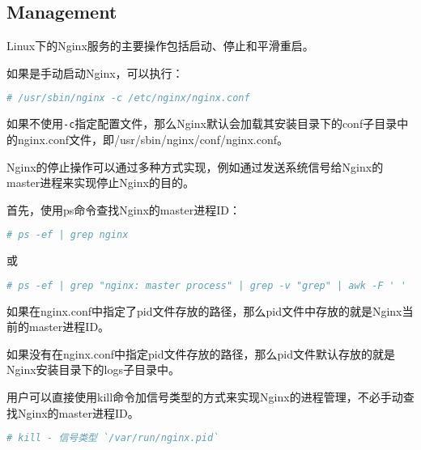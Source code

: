 \subsection{Management}



Linux下的Nginx服务的主要操作包括启动、停止和平滑重启。

如果是手动启动Nginx，可以执行：

\begin{lstlisting}[language=bash]
# /usr/sbin/nginx -c /etc/nginx/nginx.conf
\end{lstlisting}

如果不使用\texttt{-c}指定配置文件，那么Nginx默认会加载其安装目录下的conf子目录中的nginx.conf文件，即/usr/sbin/nginx/conf/nginx.conf。

Nginx的停止操作可以通过多种方式实现，例如通过发送系统信号给Nginx的master进程来实现停止Nginx的目的。

首先，使用ps命令查找Nginx的master进程ID：

\begin{lstlisting}[language=bash]
# ps -ef | grep nginx 
\end{lstlisting}

或


\begin{lstlisting}[language=bash]
# ps -ef | grep "nginx: master process" | grep -v "grep" | awk -F ' ' '{print $2}'
\end{lstlisting}



\begin{compactitem}
\item 如果在nginx.conf中指定了pid文件存放的路径，那么pid文件中存放的就是Nginx当前的master进程ID。

\item 如果没有在nginx.conf中指定pid文件存放的路径，那么pid文件默认存放的就是Nginx安装目录下的logs子目录中。
\end{compactitem}

用户可以直接使用kill命令加信号类型的方式来实现Nginx的进程管理，不必手动查找Nginx的master进程ID。

\begin{lstlisting}[language=bash]
# kill - 信号类型 `/var/run/nginx.pid`
\end{lstlisting}




